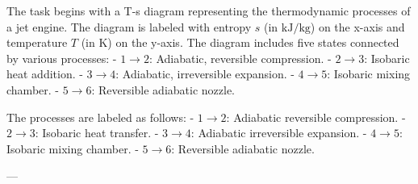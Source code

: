 The task begins with a T-s diagram representing the thermodynamic processes of a jet engine. The diagram is labeled with entropy \( s \) (in \( \text{kJ/kg} \)) on the x-axis and temperature \( T \) (in \( \text{K} \)) on the y-axis. The diagram includes five states connected by various processes:  
- \( 1 \to 2 \): Adiabatic, reversible compression.  
- \( 2 \to 3 \): Isobaric heat addition.  
- \( 3 \to 4 \): Adiabatic, irreversible expansion.  
- \( 4 \to 5 \): Isobaric mixing chamber.  
- \( 5 \to 6 \): Reversible adiabatic nozzle.  

The processes are labeled as follows:  
- \( 1 \to 2 \): Adiabatic reversible compression.  
- \( 2 \to 3 \): Isobaric heat transfer.  
- \( 3 \to 4 \): Adiabatic irreversible expansion.  
- \( 4 \to 5 \): Isobaric mixing chamber.  
- \( 5 \to 6 \): Reversible adiabatic nozzle.  

---